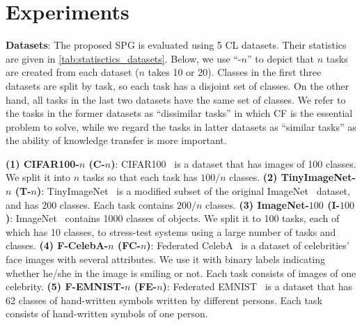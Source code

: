 \section{Experiments} \label{sec:experiments}




\textbf{Datasets}: 
The proposed SPG is evaluated using 5 CL datasets. Their statistics are given in \cref{tab:statisctics_datasets}. Below, we use ``-$n$'' to depict that $n$ tasks are created from each dataset ($n$ takes 10 or 20). 
Classes in the first three datasets are split by task, so each task has a disjoint set of classes. On the other hand, all tasks in the last two datasets have the same set of classes.
We refer to the tasks in the former datasets as ``dissimilar tasks'' in which CF is the essential problem to solve, while we regard the tasks in latter datasets as ``similar tasks'' as the ability of knowledge transfer is more important.





\textbf{(1) CIFAR100-$n$ (C-$n$)}:
CIFAR100~\citep{cifar100} is a dataset that has images of 100 classes. We split it into $n$ tasks so that each task has $100/n$ classes. 
\textbf{(2) TinyImageNet-$n$ (T-$n$)}:
TinyImageNet~\citep{tinyimagenet} is a modified subset of the original ImageNet~\citep{imagenet} dataset, and has 200 classes. Each task contains $200/n$ classes.
\textbf{(3) ImageNet-$100$ (I-$100$)}:
ImageNet~\citep{imagenet} contains 1000 classes of objects. We split it to 100 tasks, each of which has 10 classes, to stress-test systems using a large number of tasks and classes.
\textbf{(4) F-CelebA-$n$ (FC-$n$)}:
Federated CelebA~\citep{celebafemnist} is a dataset of celebrities' face images with several attributes. We use it with binary labels indicating whether he/she in the image is smiling or not. Each task consists of images of one celebrity. 
\textbf{(5) F-EMNIST-$n$ (FE-$n$)}:
Federated EMNIST~\citep{celebafemnist} is a dataset that has 62 classes of hand-written symbols written by different persons. Each task consists of hand-written symbols of one person. 







